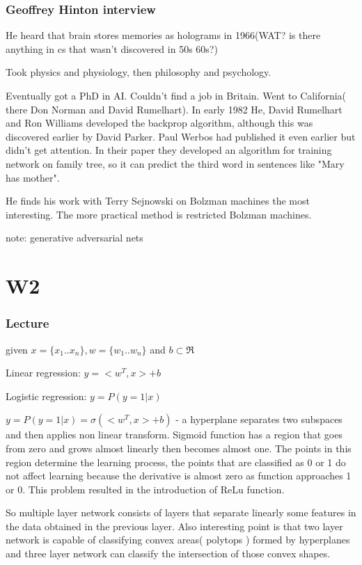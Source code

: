\documentclass[a4paper,12pt]{article}
\begin{document}
\subsubsection{Geoffrey Hinton interview}
\par He heard that brain stores memories as holograms in 1966(WAT? is there anything in cs that wasn't discovered in 50s 60s?)
\par Took physics and physiology, then philosophy and psychology.
\par Eventually got a PhD in AI. Couldn't find a job in Britain. Went to California( there Don Norman and David Rumelhart). In early 1982 He, David Rumelhart and Ron Williams developed the backprop algorithm, although this was discovered earlier by David Parker. Paul Werbos had published it even earlier but didn't get attention. In their paper they developed an algorithm for training network on family tree, so it can predict the third word in sentences like "Mary has mother".
\par He finds his work with Terry Sejnowski on Bolzman machines the most interesting. The more practical method is restricted Bolzman machines.
\par note: generative adversarial nets
\section{W2}
\subsubsection{Lecture}
\par given $x = \lbrace x_1 .. x_n \rbrace, w = \lbrace w_1 .. w_n \rbrace$ and $b \subset \Re$
\par Linear regression: $y = <w^T,x> + b$
\par Logistic regression: $y = P(y=1|x)$

$y = P(y=1|x) = \sigma(<w^T,x> + b)$ - a hyperplane separates two subspaces and then applies non linear transform. Sigmoid function has a region that goes from zero and grows almost linearly then becomes almost one. The points in this region determine the learning process, the points that are classified as 0 or 1 do not affect learning because the derivative is almost zero as function approaches 1 or 0. This problem resulted in the introduction of ReLu function.

So multiple layer network consists of layers that separate linearly some features in the data obtained in the previous layer. Also interesting point is that two layer network is capable of classifying convex areas( polytops ) formed by hyperplanes and three layer network can classify the intersection of those convex shapes.
\end{document}
